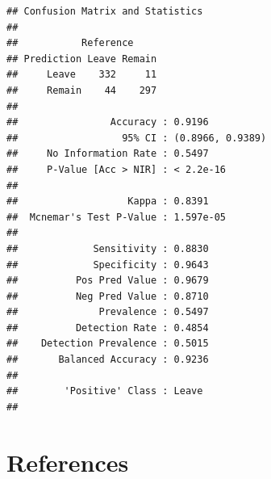 \documentclass[10pt  ,usenames, dvipsnames]{article}\usepackage[]{graphicx}\usepackage[]{color}
\makeatletter
\newenvironment{kframe}{%
 \def\at@end@of@kframe{}%
 \ifinner\ifhmode%
  \def\at@end@of@kframe{\end{minipage}}%
  \begin{minipage}{\columnwidth}%
 \fi\fi%
 \def\FrameCommand##1{\hskip\@totalleftmargin \hskip-\fboxsep
 \colorbox{shadecolor}{##1}\hskip-\fboxsep
     \hskip-\linewidth \hskip-\@totalleftmargin \hskip\columnwidth}%
 \MakeFramed {\advance\hsize-\width
   \@totalleftmargin\z@ \linewidth\hsize
   \@setminipage}}%
 {\par\unskip\endMakeFramed%
 \at@end@of@kframe}
\newenvironment{knitrout}{}{} %
\makeatother
\begin{document}
\begin{knitrout}
\color{fgcolor}\begin{kframe}
\begin{verbatim}
## Confusion Matrix and Statistics
## 
##           Reference
## Prediction Leave Remain
##     Leave    332     11
##     Remain    44    297
##                                           
##                Accuracy : 0.9196          
##                  95% CI : (0.8966, 0.9389)
##     No Information Rate : 0.5497          
##     P-Value [Acc > NIR] : < 2.2e-16       
##                                           
##                   Kappa : 0.8391          
##  Mcnemar's Test P-Value : 1.597e-05       
##                                           
##             Sensitivity : 0.8830          
##             Specificity : 0.9643          
##          Pos Pred Value : 0.9679          
##          Neg Pred Value : 0.8710          
##              Prevalence : 0.5497          
##          Detection Rate : 0.4854          
##    Detection Prevalence : 0.5015          
##       Balanced Accuracy : 0.9236          
##                                           
##        'Positive' Class : Leave           
## 
\end{verbatim}
\end{kframe}
\end{knitrout}


\clearpage




\clearpage

\section{References}\label{pubs}

\printbibliography[heading =none]


\clearpage
\end{document}
